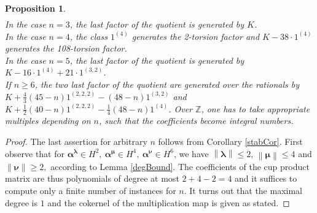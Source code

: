 \documentclass{amsart}
\newcommand{\One}{1}
\newcommand{\IZ}{\mathbb{Z}}
\theoremstyle{plain}
\newtheorem{proposition}[theorem]{Proposition}
\theoremstyle{definition}
\theoremstyle{remark}
\begin{document}
\begin{proposition}
\begin{align*}
\end{align*} 
In the case $n=3$, the last factor of the quotient is generated by $K$. 
\\In the case $n=4$, the class $ \One^{(4)}$ generates the 2-torsion factor and $K-38\cdot\One^{(4)}$ generates the 108-torsion factor.
\\In the case $n=5$, the last factor of the quotient is generated by $K - 16\cdot \One^{(4)} + 21\cdot \One^{(3,2)}$.\\
If $n\geq 6$, the two last factor of the quotient are generated over the rationals by $K +\frac{4}{3}(45-n)\One^{(2,2,2)} - (48-n)\One^{(3,2)}$ and $K+\frac{1}{2}(40-n)\One^{(2,2,2)}- \frac{1}{4}(48-n)\One^{(4)}$. Over $\IZ$, one has to take appropriate multiples depending on $n$, such that the coefficients become integral numbers.
\end{proposition}
\begin{proof} The last assertion for arbitrary $n$ follows from Corollary \ref{stabCor}. First observe that for $\boldsymbol{\alpha}^{\boldsymbol{\lambda}}\!\in\! H^2,\  \boldsymbol{\alpha}^{\boldsymbol{\mu}}\!\in\! H^4,\  \boldsymbol{\alpha}^{\boldsymbol{\nu}}\!\in\! H^6 $, we have $\left\| \boldsymbol\lambda\right\| \leq 2$, $\left\| \boldsymbol\mu\right\| \leq 4$ and $\left\| \boldsymbol\nu\right\| \geq 2,$ according to Lemma \ref{degBound}.
The coefficients of the cup product matrix are thus polynomials of degree at most $2+4-2 =4$ and it suffices to compute only a finite number of instances for $n$. It turns out that the maximal degree is $1$ and the cokernel of the multiplication map is given as stated.
\end{proof}
\end{document}
